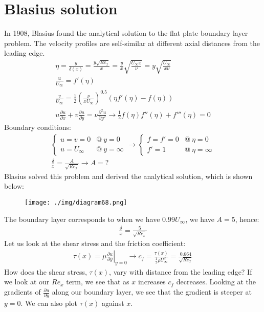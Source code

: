 \section{Blasius solution}
In 1908, Blasius found the analytical solution to the flat plate boundary layer problem. The velocity profiles are self-similar at different axial distances from the leading edge.
\begin{gather}
  \eta = \frac{y}{\delta (x)} = \frac{y\sqrt{Re_x}}{x} = \frac{y}{x} \sqrt{\frac{U_\infty x}{\nu}} = y\sqrt{\frac{U_\infty}{x\nu}}\\
  \frac{u}{U_\infty} = f'(\eta)\\
  \frac{v}{U_\infty} = \frac{1}{2} \left( \frac{\nu}{x U_\infty} \right)^{0.5} \left(\eta f'(\eta) - f (\eta)\right)\\
  u \frac{\partial u}{\partial x} + v\frac{\partial u}{\partial y} = \nu \frac{\partial^2 u}{\partial y^2} \rightarrow \frac{1}{2} f(\eta) f''(\eta)+f'''(\eta) = 0
\end{gather}
Boundary conditions:
\begin{gather}
  \begin{cases}
    u = v = 0    & @\  y = 0     \\
    u = U_\infty & @\ y = \infty
  \end{cases}\rightarrow \begin{cases}
    f = f' = 0 & @ \ \eta = 0      \\
    f' = 1     & @ \ \eta = \infty
  \end{cases}\\
  \frac{\delta}{x} = \frac{A}{\sqrt{Re_x}} \rightarrow A = ?
\end{gather}
Blasius solved this problem and derived the analytical solution, which is shown below:
\begin{figure}[H]
  \centering
  \texttt{[image: ./img/diagram68.png]}
\end{figure}
The boundary layer corresponds to when we have $0.99 U_\infty$, we have $A = 5$, hence:
\begin{align}
  \frac{\delta}{x} = \frac{5}{\sqrt{Re_x}}
\end{align}
Let us look at the shear stress and the friction coefficient:
\begin{align}
  \tau (x) = \mu \left. \frac{\partial u}{\partial y}\right|_{y=0} \rightarrow c_f = \frac{\tau (x)}{\frac{1}{2}\rho U^2_\infty} = \frac{0.664}{\sqrt{Re_x}}
\end{align}
How does the shear stress, $\tau (x)$, vary with distance from the leading edge? If we look at our $Re_x$ term, we see that as $x$ increases $c_f$ decreases. Looking at the gradients of $\frac{\partial u}{\partial y}$ along our boundary layer, we see that the gradient is steeper at $y = 0$. We can also plot $\tau (x)$ against $x$.
